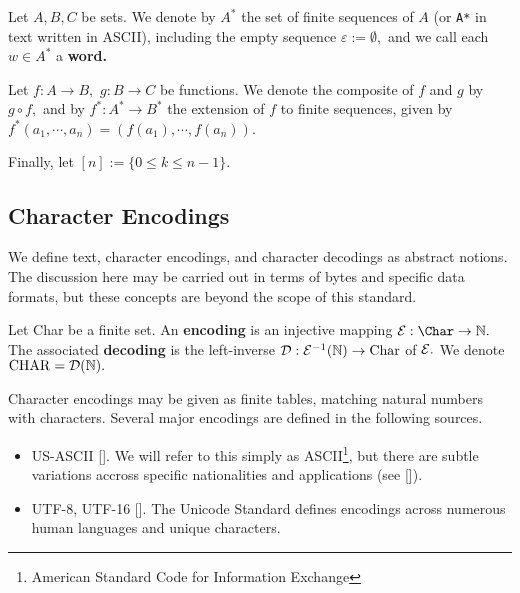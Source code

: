 Let $A, B, C$ be sets. We denote by $A^{*}$ the set of finite sequences of $A$ (or \texttt{A*} in text written in ASCII), including the empty sequence $\varepsilon := \emptyset,$ and we call each $w \in A^{*}$ a \textbf{word.}%

Let $f: A \to B,$ $g: B \to C$ be functions. We denote the composite of $f$ and $g$ by $g \circ f,$ and by $f^{*}: A^{*} \to B^{*}$ the extension of $f$ to finite sequences, given by $f^{*}(a_{1}, \cdots, a_{n}) = (f(a_{1}), \cdots, f(a_{n})).$

Finally, let $[n] := \{0 \leq k \leq n-1\}.$

\subsection{Character Encodings}
We define text, character encodings, and character decodings as abstract notions. The discussion here may be carried out in terms of bytes and specific data formats, but these concepts are beyond the scope of this standard.

Let Char be a finite set. An \textbf{encoding} is an injective mapping $\encoding : \Char \to \mathbb{N}.$ The associated \textbf{decoding} is the left-inverse $\mathcal{D}: \mathcal{E}^{-1}(\mathbb{N}) \to \mathrm{Char}$ of $\mathcal{E}.$ We denote $\mathrm{CHAR} = \mathcal{D}(\mathbb{N}).$

Character encodings may be given as finite tables, matching natural numbers with characters. Several major encodings are defined in the following sources.
\begin{itemize}
	\item US-ASCII []. We will refer to this simply as ASCII\footnote{American Standard Code for Information Exchange}, but there are subtle variations accross specific nationalities and applications (see []).
	\item UTF-8, UTF-16 []. The Unicode Standard defines encodings across numerous human languages and unique characters.  %
\end{itemize}

